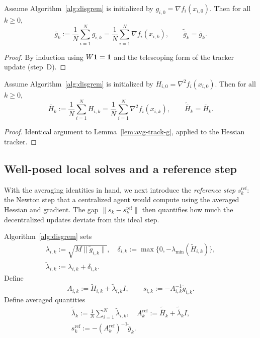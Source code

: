 \documentclass[review,onefignum,onetabnum]{siamart171218}
\begin{document}
\begin{lemma}\label{lem:avg-track-g}
Assume Algorithm~\ref{alg:disgrem} is initialized by $g_{i,0}=\nabla f_i(x_{i,0})$.
Then for all $k\ge0$,
\[
\bar g_k:=\frac1N\sum_{i=1}^N g_{i,k}=\frac1N\sum_{i=1}^N\nabla f_i(x_{i,k}),
\qquad
\tilde{\bar g}_k=\bar g_k.
\]
\end{lemma}
\begin{proof}
By induction using $W\mathbf{1}=\mathbf{1}$ and the telescoping form of the tracker update (step~D).
\end{proof}

\begin{lemma}\label{lem:avg-track-h}
Assume Algorithm~\ref{alg:disgrem} is initialized by $H_{i,0}=\nabla^2 f_i(x_{i,0})$.
Then for all $k\ge0$,
\[
\bar H_k:=\frac1N\sum_{i=1}^N H_{i,k}=\frac1N\sum_{i=1}^N\nabla^2 f_i(x_{i,k}),
\qquad
\tilde{\bar H}_k=\bar H_k.
\]
\end{lemma}
\begin{proof}
Identical argument to Lemma~\ref{lem:avg-track-g}, applied to the Hessian tracker.
\end{proof}

\subsection{Well-posed local solves and a reference step}\label{ssec:refstep}
With the averaging identities in hand, we next introduce the
\emph{reference step} $s_k^{\mathrm{ref}}$: the Newton step that a
centralized agent would compute using the averaged Hessian and gradient.
The gap $\|\bar s_k - s_k^{\mathrm{ref}}\|$ then quantifies how much the
decentralized updates deviate from this ideal step.

Algorithm~\ref{alg:disgrem} sets
\begin{gather*}
\lambda_{i,k}:=\sqrt{M\|\tilde g_{i,k}\|},\quad
\delta_{i,k}:=\max\{0,-\lambda_{\min}(\tilde H_{i,k})\},\\
\tilde\lambda_{i,k}:=\lambda_{i,k}+\delta_{i,k}.
\end{gather*}
Define
\[
A_{i,k}:=\tilde H_{i,k}+\tilde\lambda_{i,k}I,
\qquad
s_{i,k}:=-A_{i,k}^{-1}\tilde g_{i,k}.
\]
Define averaged quantities
\begin{gather*}
\tilde{\bar\lambda}_k:=\tfrac1N\textstyle\sum_{i=1}^N \tilde\lambda_{i,k},\quad
A_k^{\mathrm{ref}}:=\tilde{\bar H}_k+\tilde{\bar\lambda}_k I,\\
s_k^{\mathrm{ref}}:=-(A_k^{\mathrm{ref}})^{-1}\tilde{\bar g}_k.
\end{gather*}
\end{document}
